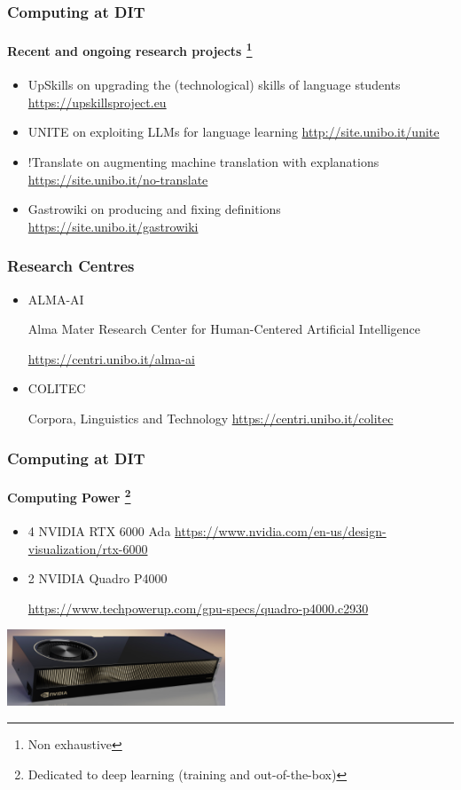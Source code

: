 \documentclass[xcolor=x11names]{beamer}
\newcommand{\light}[1]{\textcolor{gray}{#1}}
\begin{document}
\begin{frame}
\frametitle{Computing at DIT}
\framesubtitle{Recent and ongoing research projects%
\footnote{Non exhaustive}} 

\begin{itemize}
 \item \alert{UpSkills} on upgrading the (technological) skills of language 
students
	\light{\url{https://upskillsproject.eu}}
\bigskip	\pause 

 \item \alert{UNITE} on exploiting LLMs for language learning
 	\light{\url{http://site.unibo.it/unite}}
\bigskip	\pause

 \item \alert{!Translate} on augmenting machine translation with explanations
 \light{\url{https://site.unibo.it/no-translate}}
\bigskip	\pause 
 
 \item \alert{Gastrowiki} on producing and fixing definitions
	\light{\url{https://site.unibo.it/gastrowiki}}
\end{itemize}
\end{frame}

\begin{frame}
\frametitle{Research Centres}

\begin{itemize}
 \item \alert{ALMA-AI} 
 
 Alma Mater Research Center for Human-Centered Artificial Intelligence
 
 \light{\url{https://centri.unibo.it/alma-ai}}
 \bigskip								\pause 
 
 \item \alert{COLITEC}
 
 Corpora, Linguistics and Technology
 \light{\url{https://centri.unibo.it/colitec}}
\end{itemize}
\end{frame}

\begin{frame}
\frametitle{Computing at DIT}
\framesubtitle{Computing Power%
\footnote{Dedicated to deep learning (training and out-of-the-box)}} 

\begin{itemize}
 \item 4 NVIDIA RTX 6000 Ada
\light{\footnotesize 
\url{https://www.nvidia.com/en-us/design-visualization/rtx-6000}}
\bigskip

\item 2  NVIDIA Quadro P4000

\light{\footnotesize
\url{https://www.techpowerup.com/gpu-specs/quadro-p4000.c2930}}
\end{itemize}
\vspace{5mm}

\centering
\includegraphics[width=65mm]{img/01_dit_compthink_nvidia.png}

\end{frame}
\end{document}
